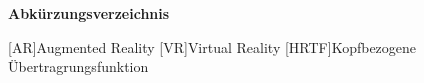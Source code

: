 \documentclass[a4paper,12pt]{scrreprt}
\begin{document}
\cleardoubleoddpage

\begin{figure}[ht]

\end{figure}
\tableofcontents
\newpage
\vspace*{30pt}
\huge{\textbf{Abkürzungsverzeichnis}} \normalsize
\vspace*{24pt}
\begin{acronym}[ECU]
[AR]{Augmented Reality}
[VR]{Virtual Reality}
[HRTF]{Kopfbezogene Übertragrungsfunktion}
\end{acronym}

\listoffigures
\pagestyle{fancy}





\end{document}
